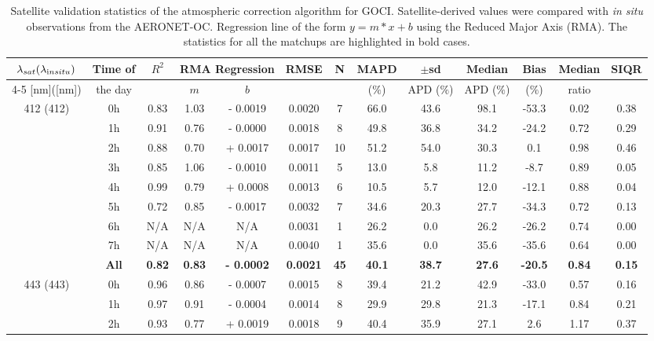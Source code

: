 \documentclass[onecolumn,3p,letterpaper,11pt]{elsarticle}
\begin{document}
\begin{table}[htbp!]
\internallinenumbers
\caption{Satellite validation statistics of the atmospheric correction algorithm for GOCI. Satellite-derived values were compared with {\it in situ} observations from the AERONET-OC. Regression line of the form $y=m*x+b$ using the Reduced Major Axis (RMA). The statistics for all the matchups are highlighted in bold cases. \label{tab:val_stats} }
\tiny
\centering
\begin{tabular}{ccccccccccccc} 
 \hline 
$\lambda_{sat} (\lambda_{\text in situ})$ & Time of & $R^2$ & \multicolumn{2}{c}{RMA Regression} & RMSE & N & MAPD & $\pm$sd & Median & Bias & Median & SIQR \\ \cline{4-5}
[nm]([nm])                  &  the day            &         & $m$     & $b$     &             &     & ($\%$)  & APD ($\%$)  & APD ($\%$)  & ($\%$)   & ratio   &         \\ \hline 
\multirow{9}{*}{412 (412)} & 0h & 0.83 & 1.03 & - 0.0019 & 0.0020 &  7 & 66.0 & 43.6 & 98.1 & -53.3 & 0.02 & 0.38 \\ 
 & 1h & 0.91 & 0.76 & - 0.0000 & 0.0018 &  8 & 49.8 & 36.8 & 34.2 & -24.2 & 0.72 & 0.29 \\ 
 & 2h & 0.88 & 0.70 & + 0.0017 & 0.0017 & 10 & 51.2 & 54.0 & 30.3 & 0.1 & 0.98 & 0.46 \\ 
 & 3h & 0.85 & 1.06 & - 0.0010 & 0.0011 &  5 & 13.0 & 5.8 & 11.2 & -8.7 & 0.89 & 0.05 \\ 
 & 4h & 0.99 & 0.79 & + 0.0008 & 0.0013 &  6 & 10.5 & 5.7 & 12.0 & -12.1 & 0.88 & 0.04 \\ 
 & 5h & 0.72 & 0.85 & - 0.0017 & 0.0032 &  7 & 34.6 & 20.3 & 27.7 & -34.3 & 0.72 & 0.13 \\ 
 & 6h & N/A & N/A & N/A & 0.0031 &  1 & 26.2 & 0.0 & 26.2 & -26.2 & 0.74 & 0.00\\ 
 & 7h & N/A & N/A & N/A & 0.0040 &  1 & 35.6 & 0.0 & 35.6 & -35.6 & 0.64 & 0.00\\ \cline{2-13}
 & \textbf{All}& \textbf{0.82} & \textbf{0.83} & \textbf{- 0.0002} & \textbf{0.0021} & \textbf{45} & \textbf{40.1} & \textbf{38.7} & \textbf{27.6} & \textbf{-20.5} & \textbf{0.84} & \textbf{0.15} \\ \hline
\multirow{9}{*}{443 (443)} & 0h  & 0.96 & 0.86 & - 0.0007 & 0.0015 &  8 & 39.4 & 21.2 & 42.9 & -33.0 & 0.57 & 0.16 \\ 
 & 1h  & 0.97 & 0.91 & - 0.0004 & 0.0014 &  8 & 29.9 & 29.8 & 21.3 & -17.1 & 0.84 & 0.21 \\ 
 & 2h  & 0.93 & 0.77 & + 0.0019 & 0.0018 &  9 & 40.4 & 35.9 & 27.1 & 2.6 & 1.17 & 0.37 \\ 

\end{tabular}
\end{table}
\end{document}

